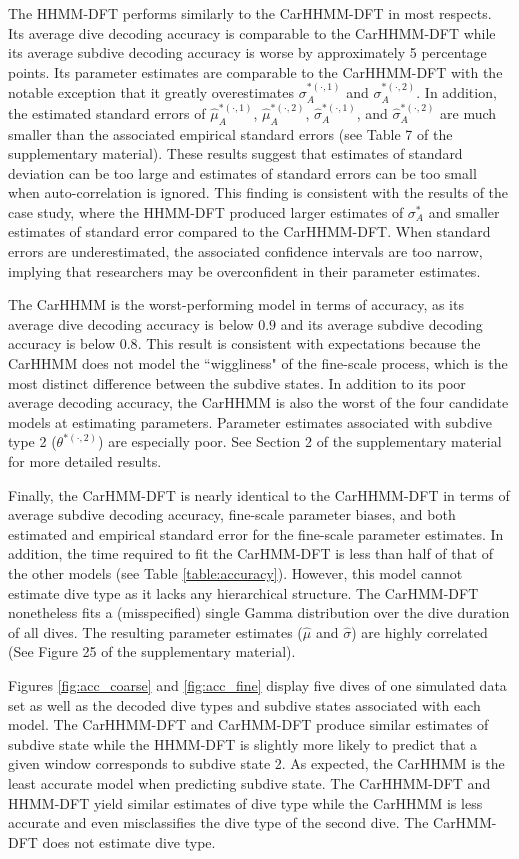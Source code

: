 The HHMM-DFT performs similarly to the CarHHMM-DFT in most respects. Its average dive decoding accuracy is comparable to the CarHHMM-DFT while its average subdive decoding accuracy is worse by approximately 5 percentage points. Its parameter estimates are comparable to the CarHHMM-DFT with the notable exception that it greatly overestimates $\sigma_A^{*(\cdot,1)}$ and $\sigma_A^{*(\cdot,2)}$. In addition, the estimated standard errors of $\hat \mu_A^{*(\cdot,1)}$, $\hat \mu_A^{*(\cdot,2)}$, $\hat \sigma_A^{*(\cdot,1)}$, and $\hat \sigma_A^{*(\cdot,2)}$ are much smaller than the associated empirical standard errors (see Table 7 of the supplementary material). These results suggest that estimates of standard deviation can be too large and estimates of standard errors can be too small when auto-correlation is ignored. This finding is consistent with the results of the case study, where the HHMM-DFT produced larger estimates of $\sigma_A^*$ and smaller estimates of standard error compared to the CarHHMM-DFT. When standard errors are underestimated, the associated confidence intervals are too narrow, implying that researchers may be overconfident in their parameter estimates.

The CarHHMM is the worst-performing model in terms of accuracy, as its average dive decoding accuracy is below $0.9$ and its average subdive decoding accuracy is below $0.8$. This result is consistent with expectations because the CarHHMM does not model the ``wiggliness" of the fine-scale process, which is the most distinct difference between the subdive states. In addition to its poor average decoding accuracy, the CarHHMM is also the worst of the four candidate models at estimating parameters. Parameter estimates associated with subdive type 2 ($\theta^{*(\cdot,2)}$) are especially poor. See Section 2 of the supplementary material for more detailed results.

Finally, the CarHMM-DFT is nearly identical to the CarHHMM-DFT in terms of average subdive decoding accuracy, fine-scale parameter biases, and both estimated and empirical standard error for the fine-scale parameter estimates. In addition, the time required to fit the CarHMM-DFT is less than half of that of the other models (see Table \ref{table:accuracy}). However, this model cannot estimate dive type as it lacks any hierarchical structure. The CarHMM-DFT nonetheless fits a (misspecified) single Gamma distribution over the dive duration of all dives. The resulting parameter estimates ($\hat \mu$ and $\hat \sigma$) are highly correlated (See Figure 25 of the supplementary material).

Figures \ref{fig:acc_coarse} and \ref{fig:acc_fine} display five dives of one simulated data set as well as the decoded dive types and subdive states associated with each model. The CarHHMM-DFT and CarHMM-DFT produce similar estimates of subdive state while the HHMM-DFT is slightly more likely to predict that a given window corresponds to subdive state 2. As expected, the CarHHMM is the least accurate model when predicting subdive state. The CarHHMM-DFT and HHMM-DFT yield similar estimates of dive type while the CarHHMM is less accurate and even misclassifies the dive type of the second dive. The CarHMM-DFT does not estimate dive type.